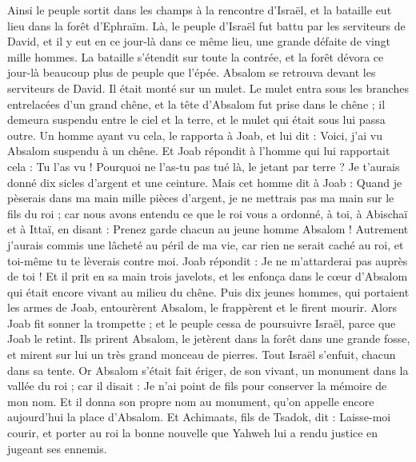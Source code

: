 \begin{multicols}{2}
Ainsi le peuple sortit dans les champs à la rencontre d'Israël, et la bataille eut lieu dans la forêt d'Ephraïm.
Là, le peuple d'Israël fut battu par les serviteurs de David, et il y eut en ce jour-là dans ce même lieu, une grande défaite de vingt mille hommes.
La bataille s'étendit sur toute la contrée, et la forêt dévora ce jour-là beaucoup plus de peuple que l'épée.
Absalom se retrouva devant les serviteurs de David. Il était monté sur un mulet. Le mulet entra sous les branches entrelacées d'un grand chêne, et la tête d'Absalom fut prise dans le chêne ; il demeura suspendu entre le ciel et la terre, et le mulet qui était sous lui passa outre.
Un homme ayant vu cela, le rapporta à Joab, et lui dit : Voici, j'ai vu Absalom suspendu à un chêne.
Et Joab répondit à l'homme qui lui rapportait cela : Tu l'as vu ! Pourquoi ne l'as-tu pas tué là, le jetant par terre ? Je t'aurais donné dix sicles d'argent et une ceinture.
Mais cet homme dit à Joab : Quand je pèserais dans ma main mille pièces d'argent, je ne mettrais pas ma main sur le fils du roi ; car nous avons entendu ce que le roi vous a ordonné, à toi, à Abischaï et à Ittaï, en disant : Prenez garde chacun au jeune homme Absalom !
Autrement j'aurais commis une lâcheté au péril de ma vie, car rien ne serait caché au roi, et toi-même tu te lèverais contre moi.
Joab répondit : Je ne m'attarderai pas auprès de toi ! Et il prit en sa main trois javelots, et les enfonça dans le cœur d'Absalom qui était encore vivant au milieu du chêne.
Puis dix jeunes hommes, qui portaient les armes de Joab, entourèrent Absalom, le frappèrent et le firent mourir.
Alors Joab fit sonner la trompette ; et le peuple cessa de poursuivre Israël, parce que Joab le retint.
Ils prirent Absalom, le jetèrent dans la forêt dans une grande fosse, et mirent sur lui un très grand monceau de pierres. Tout Israël s'enfuit, chacun dans sa tente.
Or Absalom s'était fait ériger, de son vivant, un monument dans la vallée du roi ; car il disait : Je n'ai point de fils pour conserver la mémoire de mon nom. Et il donna son propre nom au monument, qu'on appelle encore aujourd'hui la place d'Absalom.
Et Achimaats, fils de Tsadok, dit : Laisse-moi courir, et porter au roi la bonne nouvelle que Yahweh lui a rendu justice en jugeant ses ennemis.

\end{multicols}
